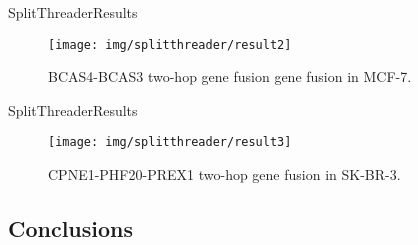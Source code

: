 \documentclass[10pt]{beamer}
\newcommand{\1}{
        	\setbeamertemplate{background}{
        		\texttt{[image: img/1\_BIO]}
        		\tikz[overlay] \fill[fill opacity=0.75,fill=white] (0,0) rectangle (-\paperwidth,\paperheight);
        	}
}
\begin{document}
\begin{frame}{SplitThreader}{Results}	
	\begin{figure}
		\centering
		\texttt{[image: img/splitthreader/result2]}
		\caption{  BCAS4-BCAS3 two-hop gene fusion gene fusion in MCF-7.}
	\end{figure}
\end{frame}

\begin{frame}{SplitThreader}{Results}	
	\begin{figure}
		\centering
		\texttt{[image: img/splitthreader/result3]}
		\caption{  CPNE1-PHF20-PREX1 two-hop gene fusion in SK-BR-3.}
	\end{figure}
\end{frame}

\subsection{Conclusions}
\end{document}
